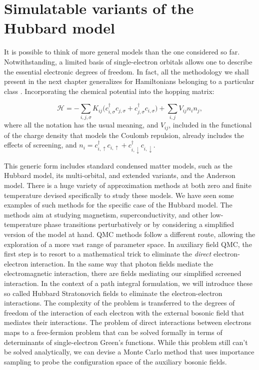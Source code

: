 \section{Simulatable variants of the Hubbard model}\label{sec:variants}

It is possible to think of more general  models than the one considered so far.
Notwithstanding, a limited basis of single-electron orbitals allows one to describe the essential electronic degrees of freedom.
In fact, all the methodology we shall present in the next chapter generalizes for Hamiltonians belonging to a particular class \cite{hanke_electronic_nodate}.
Incorporating the chemical potential into  the hopping matrix:

\begin{equation}\label{eq:variantsForm}
\mathcal{H} = - \sum_{i, j, \sigma} K_{ij} \bigg( c_{i, \sigma}^\dagger c_{j, \sigma} + c_{j, \sigma}^\dagger c_{i, \sigma} \bigg) + \sum_{i, j} V_{ij} n_i n_j ,
\end{equation}
where all the notation has the usual meaning, and $V_{ij}$, included in the functional of the charge density that models the Coulomb repulsion, already includes the effects of screening, and $n_i = c_{i,\uparrow}^\dagger c_{i,\uparrow} + c_{i,\downarrow}^\dagger c_{i,\downarrow}$.

This generic form includes standard condensed matter models, such as the Hubbard model, its multi-orbital, and extended variants, and the Anderson model.
There is a huge variety of approximation methods at both zero and finite temperature devised specifically to study these models.
We have seen some examples of such methods for the specific case of the Hubbard model.
The methods aim at studying magnetism, superconductivity, and other low-temperature phase transitions perturbatively or by considering a  simplified version of the model at hand.
\ac{QMC} methods follow a different route, allowing the exploration of a more vast range of parameter space.
In auxiliary field \ac{QMC}, the first step is to resort to a mathematical trick to eliminate the \emph{direct} electron-electron interaction.
In the same way that photon fields mediate the electromagnetic interaction, there are fields mediating our simplified screened interaction.
In the context of a path integral formulation, we will introduce these so called Hubbard Stratonovich fields to eliminate the electron-electron interactions.
The complexity of the problem is transferred to the degrees of freedom of the interaction of each electron with the external bosonic field that mediates their interactions.
The problem of direct interactions between electrons maps to a free-fermion problem that can be solved formally in terms of determinants of single-electron Green's functions.
While this problem still can't be solved analytically, we can devise a Monte Carlo method that uses importance sampling to probe the configuration space of the auxiliary bosonic fields.

